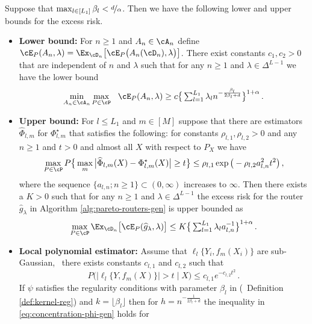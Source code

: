 \begin{theorem}
\label{thm:bound-gen}
Suppose that $\max_{l \in  [L_1]}\beta_l <  \nicefrac{d}{\alpha}$. Then we have the following lower and upper bounds for the excess risk. 
\begin{itemize}
    \item {\bf Lower bound:} For $n \ge 1$  and $A_n \in \cA_n$ define $\cE_P(A_n, \lambda) = \Ex_{\cD_n}\big[\cE_P\big(A_n(\cD_n), \lambda\big)\big]$. There exist constants $c_1, c_2> 0$ that are independent of $n$ and $\lambda$ such that for any $n\ge 1$ and $ \lambda \in \Delta^{L-1}$ we have the lower bound
    \begin{equation} \label{eq:lower-bound-gen}
      \textstyle  \min\limits_{A_n \in \cA_n} \max\limits_{P \in \cP} ~~ \cE_P(A_n, \lambda) \ge c \big \{\sum_{l = 1}^{L_1}\lambda_l n^{- \frac{\beta_l}{2\beta_l + d}}\big\}^{1+\alpha} \,.
    \end{equation}  
    \item  {\bf Upper bound:} For $l \le L_1$ and $m\in [M]$ suppose that there are estimators $\widehat\Phi_{l, m}$ for $\Phi^\star_{l, m}$ that satisfies the following: for constants $\rho_{l, 1}, \rho_{l, 2} > 0$ and any $n \ge 1$ and $t > 0$ and almost all $X$ with respect to $P_X$ we have 
    \begin{equation} \label{eq:concentration-phi-gen}
        \max_{P\in \cP} P \big \{ \max_m \big |\widehat \Phi_{l, m} (X) - \Phi^\star_{l, m}  (X)\big |  \ge t\big \} \le  \rho_{l, 1} \exp\big (- \rho_{l,2} a_{l, n}^2 t^2 \big )\,,  
    \end{equation}  where the sequence $\{a_{l, n}; n \ge 1\}\subset (0, \infty)$  increases to $\infty$. Then there exists a $K> 0$ such that for any $n \ge 1$ and $\lambda \in \Delta^{L-1} $ the excess risk for the router $\widehat g_\lambda$ in Algorithm \ref{alg:pareto-routers-gen} is upper bounded as 
    \begin{equation} \label{eq:upper-bound-gen}
      \textstyle   \max\limits_{P\in \cP} \Ex_{\cD_n}\big [\cE_P(\widehat g_\lambda,\lambda)\big ] \le K \big\{ \sum_{l = 1}^{L_1}\lambda_l a_{l, n}^{-1}\big\} ^{1+ \alpha}\,. 
    \end{equation}
    \item  {\bf Local polynomial estimator:} Assume that $\ell_l \{Y_i, f_m(X_i)\}$ are sub-Gaussian, \ie\ there exists constants $c_{l, 1}$ and $c_{l, 2}$ such that  
    \[
    \textstyle P\big ( |\ell_l \{Y, f_m(X)\} | > t \mid X\big ) \le c_{l, 1} e^{-c_{l, 2}t^2}\,. 
    \] If $\psi$ satisfies the regularity conditions with parameter $\beta_l$ in (\cf\ Definition \ref{def:kernel-reg})  and $k = \lfloor \beta_l \rfloor$ then for $h = n^{-\frac{1}{2\beta_l + d}}$ the inequality in \eqref{eq:concentration-phi-gen} holds for 

\end{itemize}
\end{theorem}
